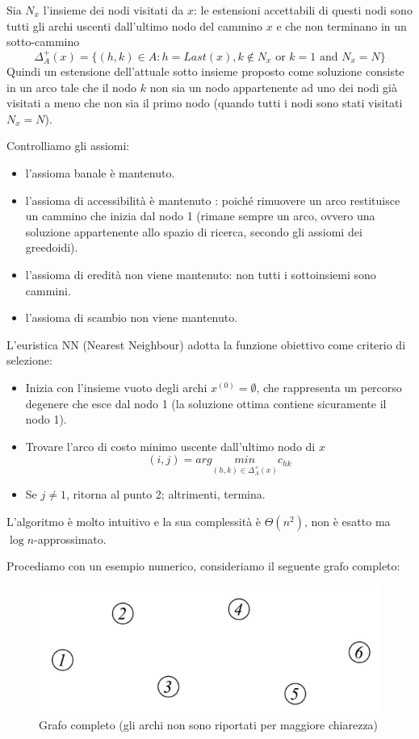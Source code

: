 \documentclass{article}
\begin{document}
    Sia $N_x$ l'insieme dei nodi visitati da $x$: le estensioni accettabili di questi nodi sono tutti gli
    archi uscenti dall'ultimo nodo del cammino $x$ e che non terminano in un sotto-cammino
    $$\Delta_A^+(x)=\{(h,k)\in A : h=Last(x),k\notin N_x\text{ or } k=1 \text{ and } N_x=N\}$$
    Quindi un estensione dell'attuale sotto insieme proposto come soluzione consiste in un arco
    tale che il nodo $k$ non sia un nodo appartenente ad uno dei nodi già visitati a meno che non sia il
    primo nodo (quando tutti i nodi sono stati visitati $N_x=N$).

    Controlliamo gli assiomi:
    \begin{itemize}
        \item l'assioma banale è mantenuto.
        \item l'assioma di accessibilità è mantenuto : poiché rimuovere un arco restituisce un cammino che
              inizia dal nodo 1 (rimane sempre un arco, ovvero una soluzione appartenente allo spazio di ricerca,
              secondo gli assiomi dei greedoidi).
        \item l'assioma di eredità non viene mantenuto: non tutti i sottoinsiemi sono cammini.
        \item l'assioma di scambio non viene mantenuto.
    \end{itemize}

    L'euristica NN (Nearest Neighbour) adotta la funzione obiettivo come criterio di selezione:
    \begin{itemize}
        \item Inizia con l'insieme vuoto degli archi $x^{(0)}=\emptyset$, che
              rappresenta un percorso degenere che esce dal nodo 1 (la soluzione ottima
              contiene sicuramente il nodo 1).
        \item Trovare l'arco di costo minimo uscente dall'ultimo nodo di $x$
              $$(i,j)= arg\underset{(h,k)\in\Delta_A^+(x)}{min}c_{hk}$$
        \item Se $j\neq 1$, ritorna al punto 2; altrimenti, termina.
    \end{itemize}
    L'algoritmo è molto intuitivo e la sua complessità è $\Theta(n^2)$, non è esatto ma
$\log n$-approssimato.

    Procediamo con un esempio numerico, consideriamo il seguente grafo completo:
    \begin{figure}[H]
        \centering
        \includegraphics[scale=0.4]{images/nume_exampl-NN-tsp.png}
        \caption{Grafo completo (gli archi non sono riportati per maggiore chiarezza)}
    \end{figure}
\end{document}
